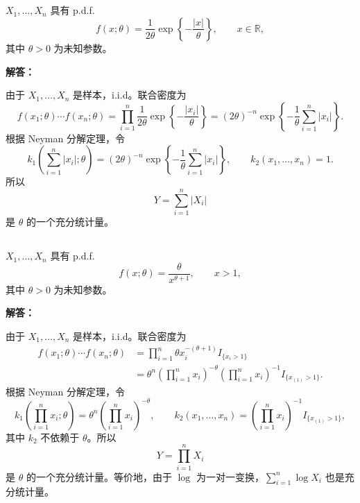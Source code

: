 \documentclass[12pt,a4paper]{article}
\begin{document}
\subsection{}

  $X_1,\ldots,X_n$ 具有 p.d.f.
  \[
  f(x;\theta)=\frac{1}{2\theta}\exp\left\{-\frac{|x|}{\theta}\right\},\qquad x\in\mathbb{R},
  \]
  其中 $\theta>0$ 为未知参数。

\begin{answerbox}
\textbf{解答：}

由于 $X_1,\ldots,X_n$ 是样本，i.i.d。联合密度为
\[
f(x_1;\theta)\cdots f(x_n;\theta)
=\prod_{i=1}^n\frac{1}{2\theta}\exp\left\{-\frac{|x_i|}{\theta}\right\}
=(2\theta)^{-n}\exp\left\{-\frac{1}{\theta}\sum_{i=1}^n|x_i|\right\}.
\]
根据 Neyman 分解定理，令
\[
k_1\left(\sum_{i=1}^n|x_i|;\theta\right)
=(2\theta)^{-n}\exp\left\{-\frac{1}{\theta}\sum_{i=1}^n|x_i|\right\},
\qquad
k_2(x_1,\ldots,x_n)=1.
\]
所以
\[
Y=\sum_{i=1}^n|X_i|
\]
是 $\theta$ 的一个充分统计量。
\end{answerbox}

\subsection{}

  $X_1,\ldots,X_n$ 具有 p.d.f.
  \[
  f(x;\theta)=\frac{\theta}{x^{\theta+1}},\qquad x>1,
  \]
  其中 $\theta>0$ 为未知参数。

\begin{answerbox}
\textbf{解答：}

由于 $X_1,\ldots,X_n$ 是样本，i.i.d。联合密度为
\[
\begin{aligned}
f(x_1;\theta)\cdots f(x_n;\theta)
&=\prod_{i=1}^n\theta x_i^{-(\theta+1)}I_{\{x_i>1\}}\\
&=\theta^n\left(\prod_{i=1}^n x_i\right)^{-\theta}
\left(\prod_{i=1}^n x_i\right)^{-1}I_{\{x_{(1)}>1\}}.
\end{aligned}
\]
根据 Neyman 分解定理，令
\[
k_1\left(\prod_{i=1}^n x_i;\theta\right)
=\theta^n\left(\prod_{i=1}^n x_i\right)^{-\theta},
\qquad
k_2(x_1,\ldots,x_n)=\left(\prod_{i=1}^n x_i\right)^{-1}I_{\{x_{(1)}>1\}},
\]
其中 $k_2$ 不依赖于 $\theta$。所以
\[
Y=\prod_{i=1}^n X_i
\]
是 $\theta$ 的一个充分统计量。等价地，由于 $\log$ 为一对一变换，$\sum_{i=1}^n\log X_i$ 也是充分统计量。
\end{answerbox}

\subsection{}
\end{document}
